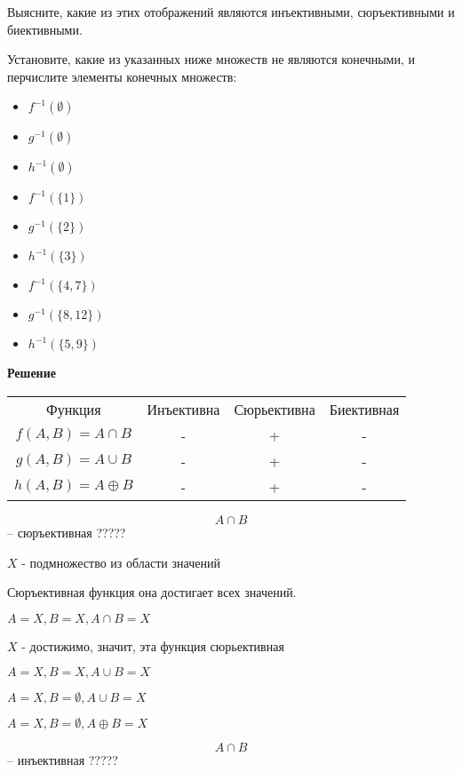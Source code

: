 \documentclass{article}
\begin{document}
Выясните, какие из этих отображений являются инъективными, сюръективными и биективными.

Установите, какие из указанных ниже множеств не являются конечными, и перчислите элементы конечных множеств:

\begin{itemize}
    \item $f^{-1}(\emptyset)$
    \item $g^{-1}(\emptyset)$
    \item $h^{-1}(\emptyset)$ 
    \item $f^{-1}(\{1\})$
    \item $g^{-1}(\{2\})$
    \item $h^{-1}(\{3\})$
    \item $f^{-1}(\{4, 7\})$
    \item $g^{-1}(\{8, 12\})$
    \item $h^{-1}(\{5, 9\})$
\end{itemize}

\textbf{Решение}

\begin{center}
\begin{tabular}{ c c c c }
  Функция & Инъективна & Сюрьективна & Биективная \\
  $f(A, B) = A \cap B$ & - & + & -\\
  $g(A, B) = A \cup B$ & - & + & -\\
  $h(A, B) = A \oplus B$ & - & + &- \\
\end{tabular}
\end{center}


$$A \cap B$$ -- сюръективная ?????

$X$ - подмножество из области значений 

Сюръективная функция она достигает всех значений.

$A = X, B = X, A \cap B = X$

$X$ - достижимо, значит, эта функция сюрьективная



$A = X, B = X, A \cup B = X$

$A = X, B = \emptyset, A \cup B = X$

$A = X, B = \emptyset, A \oplus B = X$












$$A \cap B$$ -- инъективная ?????
\end{document}
